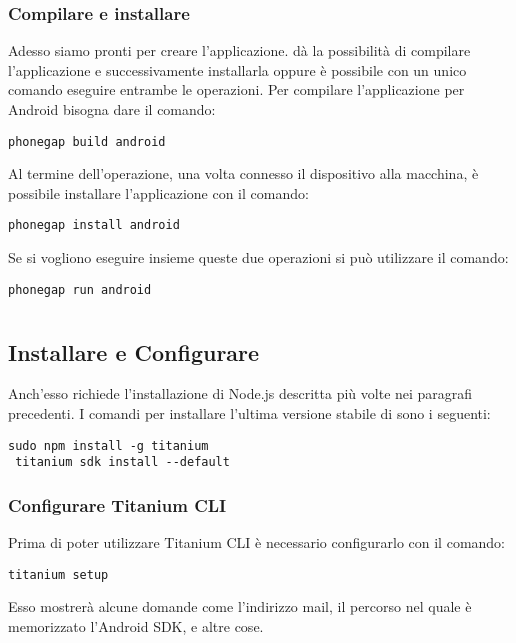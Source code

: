         \subsubsection{Compilare e installare}
            Adesso siamo pronti per creare l'applicazione. \pg{} dà la 
            possibilità di compilare l'applicazione e successivamente 
            installarla oppure è possibile con un unico comando eseguire 
            entrambe le operazioni. Per compilare l'applicazione per Android 
            bisogna dare il comando:
            \begin{lstlisting}[language=plane]
 phonegap build android
            \end{lstlisting}
            Al termine dell'operazione, una volta connesso il dispositivo alla 
            macchina, è possibile installare l'applicazione con il comando:
            \begin{lstlisting}[language=plane]
 phonegap install android
            \end{lstlisting}
            
            Se si vogliono eseguire insieme queste due operazioni si può 
            utilizzare il comando:
            \begin{lstlisting}[language=plane]
 phonegap run android
            \end{lstlisting}

\section{\tisdk{}}

    \subsection{Installare e Configurare \tisdk{}}
    Anch'esso richiede l'installazione di Node.js descritta più volte nei
    paragrafi precedenti. I comandi per installare l'ultima versione stabile
    di \tisdk{} sono i seguenti:
    \begin{lstlisting}[language=plane]
 sudo npm install -g titanium
 titanium sdk install --default
    \end{lstlisting}
        \subsubsection{Configurare Titanium CLI}
        Prima di poter utilizzare Titanium CLI è necessario configurarlo con
        il comando:
    \begin{lstlisting}[language=plane]
 titanium setup
    \end{lstlisting}
    Esso mostrerà alcune domande come l'indirizzo mail, il percorso nel quale
    è memorizzato l'Android SDK, e altre cose.

